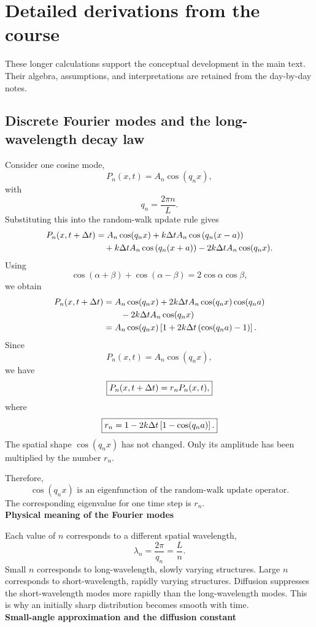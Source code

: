 \clearpage
\section{Detailed derivations from the course}
\label{app:derivations}
These longer calculations support the conceptual development in the main text.
Their algebra, assumptions, and interpretations are retained from the day-by-day notes.
\subsection{Discrete Fourier modes and the long-wavelength decay law}
\label{deriv:discrete-modes}


Consider one cosine mode,
\[
    P_n(x,t) = A_n\cos(q_nx),
\]
with
\[
    q_n = \frac{2\pi n}{L}.
\]
Substituting this into the random-walk update rule gives
\begin{align*}
    P_n(x,t+\Delta t) &= A_n \cos(q_nx) + k\Delta t A_n \cos \left( q_n(x-a) \right)
    \nonumber\\
    &\quad + k\Delta t A_n \cos \left( q_n(x+a) \right) - 2k\Delta t A_n \cos(q_nx).
\end{align*}
Using
\[
    \cos (\alpha + \beta) + \cos (\alpha - \beta) = 2 \cos \alpha \cos \beta,
\]
we obtain
\begin{align*}
    P_n(x,t+\Delta t) &= A_n\cos(q_nx) + 2k\Delta t A_n\cos(q_nx)\cos(q_na)
    \nonumber\\
    &\qquad - 2k\Delta t A_n\cos(q_nx)
    \\
    &= A_n\cos(q_nx) \left[ 1+2k\Delta t\left(\cos(q_na)-1\right) \right].
\end{align*}
Since
\[
    P_n(x,t) = A_n\cos(q_nx),
\]
we have
\[
    \boxed{ P_n(x,t+\Delta t) = r_n P_n(x,t), }
\]
where
\[
    \boxed{ r_n = 1 - 2k\Delta t \left[ 1-\cos(q_na) \right]. }
\]
The spatial shape $\cos(q_nx)$ has not changed. 
Only its amplitude has been multiplied by the number $r_n$.

Therefore,
\[
    \boxed{ \cos(q_nx) \text{ is an eigenfunction of the random-walk update operator.} }
\]
The corresponding eigenvalue for one time step is $r_n$.
% 
% 
\medskip
\\
\textbf{Physical meaning of the Fourier modes}

Each value of $n$ corresponds to a different spatial wavelength,
\[
    \lambda_n = \frac{2\pi}{q_n} = \frac{L}{n}.
\]
Small $n$ corresponds to long-wavelength, slowly varying structures. 
Large $n$ corresponds to short-wavelength, rapidly varying structures. 
Diffusion suppresses the short-wavelength modes more rapidly than the long-wavelength modes. 
This is why an initially sharp distribution becomes smooth with time.
% 
% 
\medskip
\\
\textbf{Small-angle approximation and the diffusion constant}

